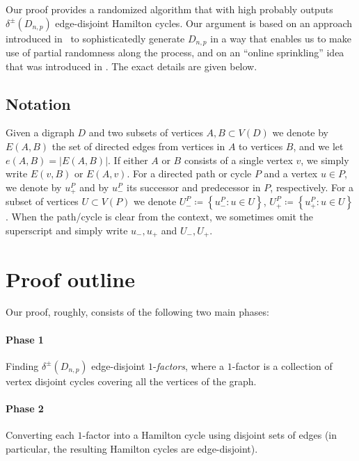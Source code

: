 \documentclass{article}
\begin{document}
	
	Our proof provides a randomized algorithm that with high probably outputs $\delta^{\pm}(D_{n,p})$ edge-disjoint Hamilton cycles. Our argument is based on an approach introduced in~\cite{ferber2018counting} to sophisticatedly generate $D_{n,p}$ in a way that enables us to make use of partial randomness along the process, and on an ``online sprinkling'' idea that was introduced in \cite{OnlineSprinkling}. The exact details are given below.
	
	
	\subsection{Notation}
	Given a digraph $D$ and two subsets of vertices $A,B \subset V(D)$ we denote by $E(A,B)$ the set of directed edges from vertices in $A$ to vertices $B$, and we let $e(A,B) = \big|E(A,B) \big|$.
	If either $A$ or $B$ consists of a single vertex $v$, we simply write $E(v,B)$ or $E(A,v)$.
	For a directed path or cycle $P$ and a vertex $u \in P$, we denote by $u^P_+$ and by $u^P_-$ its successor and predecessor in $P$, respectively.
	For a subset of vertices $U \subset V(P)$ we denote $U^P_- \coloneqq \left\{u^P_- : u \in U \right\}$, $U^P_+ \coloneqq \left\{u^P_+ : u \in U \right\}$.
	When the path/cycle is clear from the context, we sometimes omit the superscript and simply write $u_-, u_+$ and $U_-, U_+$.
	
	
	\section{Proof outline}
	\label{sec:ProofOutline}
	
	Our proof, roughly, consists of the following two main phases: 
	
	\paragraph*{Phase 1} Finding $\delta^{\pm}(D_{n,p})$ edge-disjoint $1$-\emph{factors}, where a $1$-factor is a collection of vertex disjoint cycles covering all the vertices of the graph.
	\paragraph*{Phase 2} Converting each $1$-factor into a Hamilton cycle using disjoint sets of edges (in particular, the resulting Hamilton cycles are edge-disjoint). 
	\bigskip
	
\end{document}
